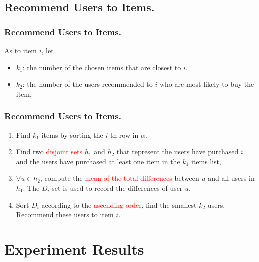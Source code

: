 \documentclass{beamer}
\newcommand{\red}[1]{\textcolor{red}{#1}}%
\begin{document}
\subsection{Recommend Users to Items.}
\begin{frame}
\frametitle{Recommend Users to Items.}
\vskip -0.2in
As to item $i$, let
\vskip 0.2in
\begin{itemize}
\item $k_1$: the number of the chosen items that are closest to $i$.
\vskip 0.2in
\item $k_2$: the number of the users recommended to $i$ who are most likely to buy the item.
\end{itemize}
\end{frame}

\begin{frame}
\frametitle{Recommend Users to Items.}
\begin{enumerate}
\item<2-> Find $k_1$ items by sorting the $i$-th row in $\alpha$.
\vskip 0.2in
\item<3-> Find two \red{disjoint sets} $h_1$ and $h_2$ that represent the users have purchased $i$ and the users have purchased at least one item in the $k_1$ items list,
\vskip 0.2in
\item<4-> $\forall u \in h_2$, compute the \red{mean of the total differences} between $u$ and all users in $h_1$. The $D_i$ set is used to record the differences of user $u$.
\vskip 0.2in
\item<5-> Sort $D_i$ according to the \red{ascending order}, find the smallest $k_2$ users. Recommend these users to item $i$.
\end{enumerate}
\end{frame}

\section{Experiment Results}
\end{document}
